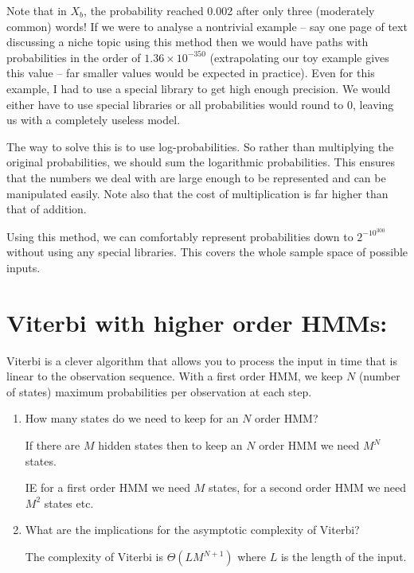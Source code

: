 \documentclass[10pt,\jkfside,a4paper]{article}
\begin{document}
\begin{enumerate}
Note that in $X_b$, the probability reached 0.002 after only three (moderately common) words! 
If we were to analyse a nontrivial example -- say one page of text discussing a niche topic 
using this method then we would have 
paths with probabilities in the order of $1.36 \times 10^{-350}$ (extrapolating our toy 
example gives this value -- far smaller values would be expected in practice). 
Even for this example, I had to use a special library to get high enough 
precision. We would either have to use special libraries or all probabilities would 
round to 0, leaving us with a completely useless model.

The way to solve this is to use log-probabilities. So rather than multiplying the original 
probabilities, we should sum the logarithmic probabilities. This ensures that the numbers we 
deal with are large enough to be represented and can be manipulated easily. Note also 
that the cost of multiplication is far higher than that of addition.

Using this method, we can comfortably represent probabilities down to $2^{-10^{300}}$ without 
using any special libraries. This covers the whole sample space of possible inputs.

\end{enumerate}

\section*{Viterbi with higher order HMMs:}

Viterbi is a clever algorithm that allows you to process the input in time that is
linear to the observation sequence. With a first order HMM, we keep $N$ (number
of states) maximum probabilities per observation at each step.

\begin{enumerate}

\item How many states do we need to keep for an $N$ order HMM?

If there are $M$ hidden states then to keep an $N$ order HMM we need 
$M^{N}$ states.

IE for a first order HMM we need $M$ states, for a second order HMM 
we need $M^2$ states etc.

\item What are the implications for the asymptotic complexity of Viterbi?

The complexity of Viterbi is $\Theta(LM^{N + 1})$ where $L$ is the length of the 
input.

\end{enumerate}
\end{document}
